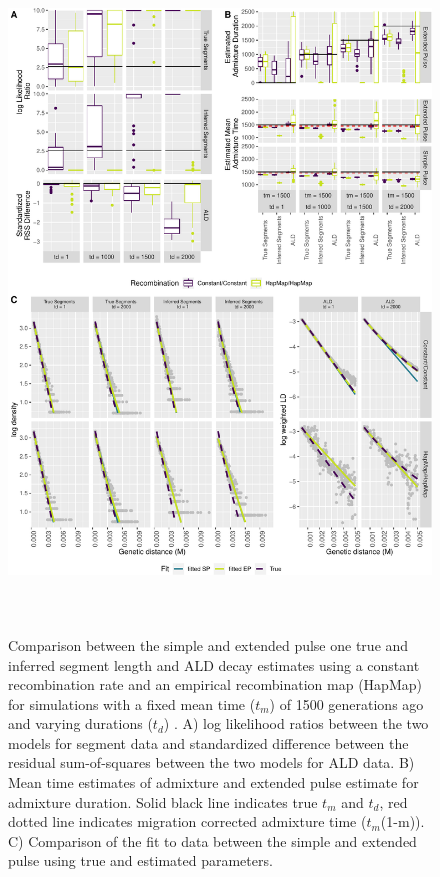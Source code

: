 \documentclass[11pt]{article}
\begin{document}
\begin{figure}
\centering
\includegraphics[width=16cm,height=18cm,keepaspectratio]{ATE_Revisions_files/figure-latex/figResult2_all_together-1.pdf}
\caption{\label{fig:figResult2} Comparison between the simple and extended pulse one true and inferred segment length and ALD decay estimates using a constant recombination rate and an empirical recombination map (HapMap) for simulations with a fixed mean time ($t_m$) of 1500 generations ago and varying durations ($t_d$) . A) log likelihood ratios between the two models for segment data and standardized difference between the residual sum-of-squares between the two models for ALD data. B) Mean time estimates of admixture and extended pulse estimate for admixture duration. Solid black line indicates true $t_m$ and $t_d$, red dotted line indicates migration corrected admixture time ($t_m$(1-m)). C) Comparison of the fit to data between the simple and extended pulse using true and estimated parameters. }
\end{figure}
\end{document}
